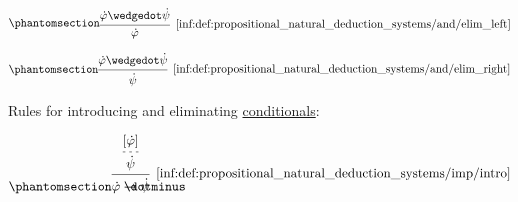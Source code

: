 \begin{definition}
\begin{thmenum}
\begin{paracol}{3}
      \begin{nthcolumn}{1}
        \ParacolAlignmentHack
        \begin{equation*}\taglabel[\ensuremath{ \wedge_{-L} }]{inf:def:propositional_natural_deduction_systems/and/elim_left}
          \begin{prooftree}
            \hypo{ \syn\varphi \synwedge \syn\psi }
            \infer1[\ref{inf:def:propositional_natural_deduction_systems/and/elim_left}]{ \syn\varphi }
          \end{prooftree}
        \end{equation*}
      \end{nthcolumn}

      \begin{nthcolumn}{2}
        \ParacolAlignmentHack
        \begin{equation*}\taglabel[\ensuremath{ \wedge_{-R} }]{inf:def:propositional_natural_deduction_systems/and/elim_right}
          \begin{prooftree}
            \hypo{ \syn\varphi \synwedge \syn\psi }
            \infer1[\ref{inf:def:propositional_natural_deduction_systems/and/elim_right}]{ \syn\psi }
          \end{prooftree}
        \end{equation*}
      \end{nthcolumn}
    \end{paracol}

     Rules for introducing and eliminating \hyperref[def:propositional_alphabet/connectives/conditional]{conditionals}:
    \begin{paracol}{2}
      \begin{leftcolumn}
        \ParacolAlignmentHack
        \begin{equation*}\taglabel[\ensuremath{ \rightarrow_+ }]{inf:def:propositional_natural_deduction_systems/imp/intro}
          \begin{prooftree}[center=false]
            \hypo{ [\syn\varphi] }
            \infer[dashed]1{ \syn\psi }
            \infer1[\ref{inf:def:propositional_natural_deduction_systems/imp/intro}]{ \syn\varphi \synimplies \syn\psi }
          \end{prooftree}
        \end{equation*}
      \end{leftcolumn}


\end{paracol}
\end{thmenum}
\end{definition}

